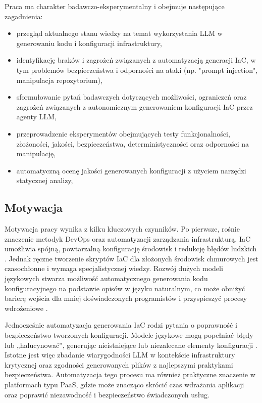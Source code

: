 Praca ma charakter badawczo-eksperymentalny i obejmuje następujące zagadnienia:
\begin{itemize}
\item przegląd aktualnego stanu wiedzy na temat wykorzystania LLM w generowaniu kodu i konfiguracji infrastruktury,
\item identyfikację braków i zagrożeń związanych z automatyzacją generacji IaC, w tym problemów bezpieczeństwa i odporności na ataki (np. "prompt injection", manipulacja repozytorium),
\item sformułowanie pytań badawczych dotyczących możliwości, ograniczeń oraz zagrożeń związanych z autonomicznym generowaniem konfiguracji IaC przez agenty LLM,
\item przeprowadzenie eksperymentów obejmujących testy funkcjonalności, złożoności, jakości, bezpieczeństwa, deterministyczności oraz odporności na manipulację,
\item automatyczną ocenę jakości generowanych konfiguracji z użyciem narzędzi statycznej analizy,
\end{itemize}

\subsection{Motywacja}

Motywacja pracy wynika z kilku kluczowych czynników. Po pierwsze, rośnie znaczenie metodyk DevOps oraz automatyzacji zarządzania infrastrukturą. IaC umożliwia spójną, powtarzalną konfigurację środowisk i redukcję błędów ludzkich \cite{low_repairing_2024}. Jednak ręczne tworzenie skryptów IaC dla złożonych środowisk chmurowych jest czasochłonne i wymaga specjalistycznej wiedzy. Rozwój dużych modeli językowych stwarza możliwość automatycznego generowania kodu konfiguracyjnego na podstawie opisów w języku naturalnym, co może obniżyć barierę wejścia dla mniej doświadczonych programistów i przyspieszyć procesy wdrożeniowe \cite{hu_llm-based_2025}.

Jednocześnie automatyzacja generowania IaC rodzi pytania o poprawność i bezpieczeństwo tworzonych konfiguracji. Modele językowe mogą popełniać błędy lub „halucynować”, generując nieistniejące lub niezalecane elementy konfiguracji \cite{malul_genkubesec_2024}. Istotne jest więc zbadanie wiarygodności LLM w kontekście infrastruktury krytycznej oraz zgodności generowanych plików z najlepszymi praktykami bezpieczeństwa. Automatyzacja tego procesu ma również praktyczne znaczenie w platformach typu PaaS, gdzie może znacząco skrócić czas wdrażania aplikacji oraz poprawić niezawodność i bezpieczeństwo świadczonych usług.

